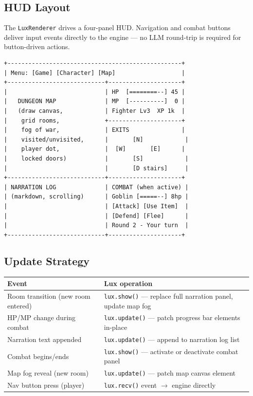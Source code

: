 \documentclass[a4paper,10pt]{article}
\newcommand{\tool}[1]{\texttt{#1}}
\begin{document}
\subsection{HUD Layout}

The \texttt{LuxRenderer} drives a four-panel HUD.  Navigation and
combat buttons deliver input events directly to the engine --- no
LLM round-trip is required for button-driven actions.

\begin{lstlisting}[title={Lux HUD layout (schematic)}]
+--------------------------------------------------+
| Menu: [Game] [Character] [Map]                   |
+----------------------------+---------------------+
|                            | HP  [========--] 45 |
|   DUNGEON MAP              | MP  [----------]  0 |
|   (draw canvas,            | Fighter Lv3  XP 1k  |
|    grid rooms,             +---------------------+
|    fog of war,             | EXITS               |
|    visited/unvisited,      |       [N]            |
|    player dot,             |  [W]       [E]      |
|    locked doors)           |       [S]            |
|                            |       [D stairs]     |
+----------------------------+---------------------+
| NARRATION LOG              | COMBAT (when active) |
| (markdown, scrolling)      | Goblin [=====--] 8hp |
|                            | [Attack] [Use Item]  |
|                            | [Defend] [Flee]      |
|                            | Round 2 - Your turn  |
+----------------------------+---------------------+
\end{lstlisting}

\subsection{Update Strategy}

\begin{center}
\begin{tabular}{lp{8cm}}
\toprule
\textbf{Event} & \textbf{Lux operation} \\
\midrule
Room transition (new room entered)
  & \tool{lux.show()} --- replace full narration panel, update map fog \\
HP/MP change during combat
  & \tool{lux.update()} --- patch progress bar elements in-place \\
Narration text appended
  & \tool{lux.update()} --- append to narration log list \\
Combat begins/ends
  & \tool{lux.show()} --- activate or deactivate combat panel \\
Map fog reveal (new room)
  & \tool{lux.update()} --- patch map canvas element \\
Nav button press (player)
  & \tool{lux.recv()} event $\to$ engine directly \\
\bottomrule
\end{tabular}
\end{center}
\end{document}

